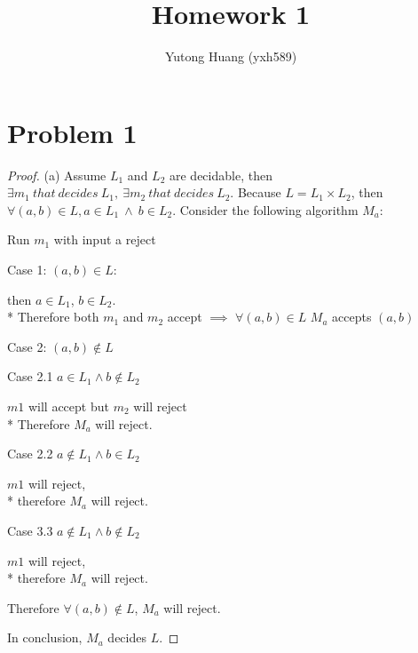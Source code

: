 \documentclass{article}
\title{\vspace{-3cm}Homework 1}
\author{Yutong Huang (yxh589)}
\date{}
\begin{document}
\maketitle
\section*{Problem 1}
\begin{proof}
    (a) Assume $L_1$ and $L_2$ are decidable, \newline
    then $\exists m_1\ that\ decides\ L_1,\ \exists m_2\ that\ decides\ L_2$. \newline
    Because $L = L_1 \times L_2$, then $\forall (a,b) \in L, a \in L_1\ \land\ b \in L_2.$ \newline
    Consider the following algorithm $M_a$:
    \begin{algorithm}
        \caption{$M_a$}
        \DontPrintSemicolon

        Run $m_1$ with input a\;
        \Return reject\;
    \end{algorithm} \newline
    Case 1: $(a,b) \in L$:
    \begin{addmargin}[1em]{0em}
        then $a \in L_1$, $b \in L_2$. \\*
        Therefore both $m_1$ and $m_2$ accept
        $\implies$ $\forall (a,b) \in L$ $M_a$ accepts $(a,b)$
    \end{addmargin}
    Case 2: $(a,b) \notin L$
    \begin{addmargin}[1em]{0em}
        Case 2.1 $a \in L_1 \land b \notin L_2$
        \begin{addmargin}[1em]{0em}
            $m1$ will accept but $m_2$ will reject\\*
            Therefore $M_a$ will reject.
        \end{addmargin}
        Case 2.2 $a \notin L_1 \land b \in L_2$
        \begin{addmargin}[1em]{0em}
            $m1$ will reject,\\*
            therefore $M_a$ will reject.
        \end{addmargin}
        Case 3.3 $a \notin L_1 \land b \notin L_2$
        \begin{addmargin}[1em]{0em}
            $m1$ will reject,\\*
            therefore $M_a$ will reject.
        \end{addmargin}
        Therefore $\forall (a, b) \notin L$, $M_a$ will reject.
    \end{addmargin}
    In conclusion, $M_a$ decides $L$. \newline


\end{proof}
\end{document}
